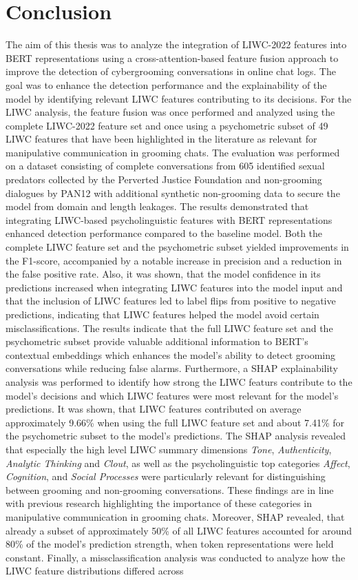 \chapter{Conclusion}
The aim of this thesis was to analyze the integration of LIWC-2022 features into BERT representations using a cross-attention-based feature fusion approach to improve the detection of cybergrooming conversations in online chat logs. The goal was to enhance the detection performance and the explainability of the model by identifying relevant LIWC features contributing to its decisions. For the LIWC analysis, the feature fusion was once performed and analyzed using the complete LIWC-2022 feature set and once using a psychometric subset of 49 LIWC features that have been highlighted in the literature as relevant for manipulative communication in grooming chats. The evaluation was performed on a dataset consisting of complete conversations from 605 identified sexual predators collected by the Perverted Justice Foundation and non-grooming dialogues by PAN12 with additional synthetic non-grooming data to secure the model from domain and length leakages. The results demonstrated that integrating LIWC-based psycholinguistic features with BERT representations enhanced detection performance compared to the baseline model. Both the complete LIWC feature set and the psychometric subset yielded improvements in the F1-score, accompanied by a notable increase in precision and a reduction in the false positive rate. Also, it was shown, that the model confidence in its predictions increased when integrating LIWC features into the model input and that the inclusion of LIWC features led to label flips from positive to negative predictions, indicating that LIWC features helped the model avoid certain misclassifications. The results indicate that the full LIWC feature set and the psychometric subset provide valuable additional information to BERT's contextual embeddings which enhances the model's ability to detect grooming conversations while reducing false alarms. Furthermore, a SHAP explainability analysis was performed to identify how strong the LIWC featurs contribute to the model's decisions and which LIWC features were most relevant for the model's predictions. It was shown, that LIWC features contributed on average approximately 9.66\% when using the full LIWC feature set and about 7.41\% for the psychometric subset to the model’s predictions. The SHAP analysis revealed that especially the high level LIWC summary dimensions \textit{Tone}, \textit{Authenticity}, \textit{Analytic Thinking} and \textit{Clout}, as well as the psycholinguistic top categories \textit{Affect}, \textit{Cognition}, and \textit{Social Processes} were particularly relevant for distinguishing between grooming and non-grooming conversations. These findings are in line with previous research highlighting the importance of these categories in manipulative communication in grooming chats. Moreover, SHAP revealed, that already a subset of approximately 50\% of all LIWC features accounted for around 80\% of the model’s prediction strength, when token representations were held constant. Finally, a missclassification analysis was conducted to analyze how the LIWC feature distributions differed across 